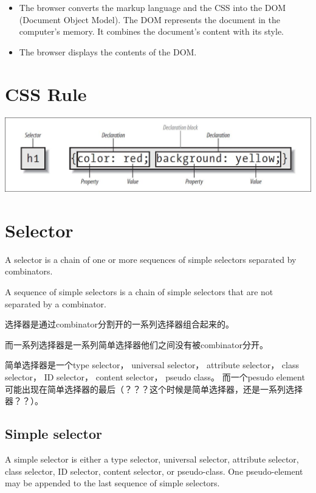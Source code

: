 \begin{itemize}
\item The browser converts the markup language and the CSS into the DOM (Document Object Model). The DOM represents the document in the computer's memory. It combines the document's content with its style.
\item The browser displays the contents of the DOM.
\end{itemize}


\section{CSS Rule}

\includegraphics[scale=0.75]{css/resources/css-rule.jpg}

\section{Selector}

A selector is a chain of one or more sequences of simple selectors separated by combinators.

A sequence of simple selectors is a chain of simple selectors that are not separated by a combinator.



选择器是通过combinator分割开的一系列选择器组合起来的。

而一系列选择器是一系列简单选择器他们之间没有被combinator分开。

简单选择器是一个type selector， universal selector， attribute selector， class selector， ID selector， content selector， pseudo class。 而一个pesudo element可能出现在简单选择器的最后（？？？这个时候是简单选择器，还是一系列选择器？？）。


\subsection{Simple selector}

A simple selector is either a type selector, universal selector, attribute selector, class selector, ID selector, content selector, or pseudo-class. One pseudo-element may be appended to the last sequence of simple selectors.


